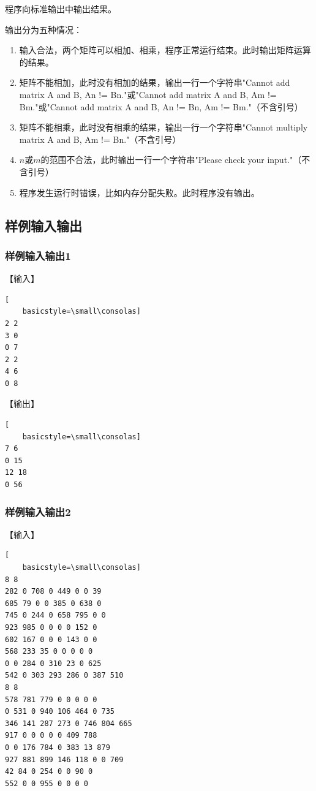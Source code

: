 \documentclass{article}
\begin{document}
程序向标准输出中输出结果。

输出分为五种情况：

\begin{enumerate}
    \item 输入合法，两个矩阵可以相加、相乘，程序正常运行结束。此时输出矩阵运算的结果。
    \item 矩阵不能相加，此时没有相加的结果，输出一行一个字符串"Cannot add matrix A and B, An != Bn."或"Cannot add matrix A and B, Am != Bm."或"Cannot add matrix A and B, An != Bn, Am != Bm."（不含引号）
    \item 矩阵不能相乘，此时没有相乘的结果，输出一行一个字符串"Cannot multiply matrix A and B, Am != Bn."（不含引号）
    \item $n$或$m$的范围不合法，此时输出一行一个字符串"Please check your input."（不含引号）
    \item 程序发生运行时错误，比如内存分配失败。此时程序没有输出。
\end{enumerate}

\subsection{样例输入输出}

\subsubsection{样例输入输出1}

【输入】

\begin{lstlisting}[
    basicstyle=\small\consolas]
2 2
3 0
0 7
2 2
4 6
0 8
\end{lstlisting}

【输出】

\begin{lstlisting}[
    basicstyle=\small\consolas]
7 6 
0 15 
12 18 
0 56 
\end{lstlisting}

\subsubsection{样例输入输出2}

【输入】

\begin{lstlisting}[
    basicstyle=\small\consolas]
8 8
282 0 708 0 449 0 0 39
685 79 0 0 385 0 638 0
745 0 244 0 658 795 0 0
923 985 0 0 0 0 152 0
602 167 0 0 0 143 0 0
568 233 35 0 0 0 0 0
0 0 284 0 310 23 0 625
542 0 303 293 286 0 387 510
8 8
578 781 779 0 0 0 0 0
0 531 0 940 106 464 0 735
346 141 287 273 0 746 804 665
917 0 0 0 0 0 409 788
0 0 176 784 0 383 13 879
927 881 899 146 118 0 0 709
42 84 0 254 0 0 90 0
552 0 0 955 0 0 0 0
\end{lstlisting}
\end{document}

